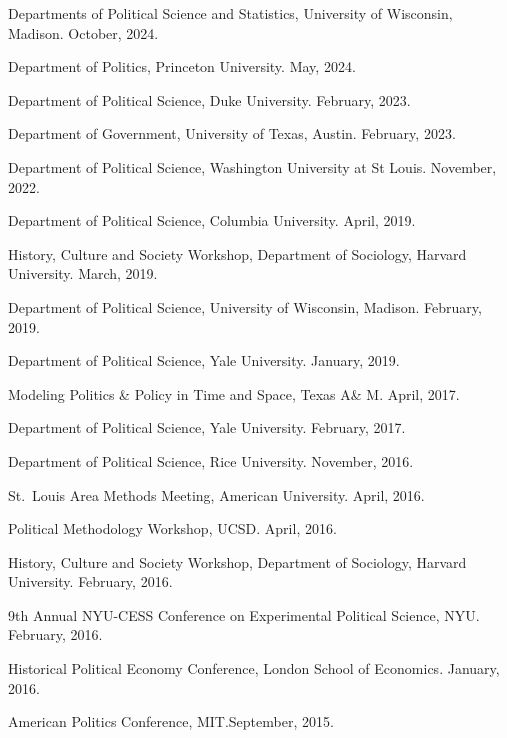 \documentclass[11pt,article,oneside]{memoir}
\begin{document}
\begin{cvlist}[itemsep = 0em, parsep = 0em]
  \item Departments of Political Science and Statistics, University of Wisconsin, Madison. October, 2024.
  \item Department of Politics, Princeton University. May, 2024. 
  \item Department of Political Science, Duke University. February, 2023. 
\item  Department of Government, University of Texas, Austin. February, 2023.
\item  Department of Political Science, Washington University at St Louis. November, 2022.
  \item  Department of Political Science,  Columbia University. April, 2019.
  \item History, Culture and Society Workshop, Department of Sociology, Harvard University. March, 2019. 
  \item  Department of Political Science,  University of Wisconsin, Madison. February, 2019. 
  \item  Department of Political Science, Yale University. January, 2019. 

  \item  Modeling Politics \& Policy in Time and Space, Texas A\& M. April, 2017. 

  \item  Department of Political Science, Yale University. February, 2017. 

  \item  Department of Political Science, Rice University. November, 2016. 

  \item  St.\ Louis Area Methods Meeting, American University. April, 2016. 

  \item  Political Methodology Workshop, UCSD. April, 2016. 
  \item History, Culture and Society Workshop, Department of Sociology, Harvard University. February, 2016.
  \item  9th Annual NYU-CESS Conference on Experimental Political Science, NYU. February, 2016. 

  \item  Historical Political Economy Conference, London School of Economics. January, 2016. 

  \item  American Politics Conference, MIT.\@ September, 2015. 


\end{cvlist}
\end{document}
